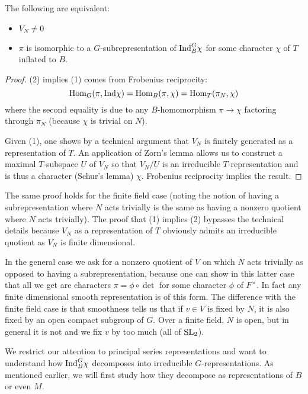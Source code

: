 \begin{prop}
    The following are equivalent:
    \begin{itemize}
        \item $V_N \neq 0$
        \item $\pi$ is isomorphic to a $G$-subrepresentation of $\mathrm{Ind}_B^G \chi$ for some character $\chi$ of $T$ inflated to $B$.
    \end{itemize}
\end{prop}
\begin{proof}
    (2) implies (1) comes from Frobenius reciprocity:
    $$\mathrm{Hom}_G(\pi,\mathrm{Ind} \chi) = \mathrm{Hom}_B(\pi, \chi) = \mathrm{Hom}_T(\pi_N,\chi)$$ where the second equality is due to any $B$-homomorphism $\pi \to \chi$ factoring through $\pi_N$ (because $\chi$ is trivial on $N$).

    Given (1), one shows by a technical argument that $V_N$ is finitely generated as a representation of $T$. An application of Zorn's lemma allows us to construct a maximal $T$-subspace $U$ of $V_N$ so that $V_N/U$ is an irreducible $T$-representation and is thus a character (Schur's lemma) $\chi$. Frobenius reciprocity implies the result.
\end{proof}
\begin{rem}
    The same proof holds for the finite field case (noting the notion of having a subrepresentation where $N$ acts trivially is the same as having a nonzero quotient where $N$ acts trivially). The proof that (1) implies (2) bypasses the technical details because $V_N$ as a representation of $T$ obviously admits an irreducible quotient as $V_N$ is finite dimensional.
\end{rem}
\begin{rem}
    In the general case we ask for a nonzero quotient of $V$ on which $N$ acts trivially as opposed to having a subrepresentation, because one can show in this latter case that all we get are characters $\pi = \phi \circ \det$ for some character $\phi$ of $F^\times$. In fact any finite dimensional smooth representation is of this form. The difference with the finite field case is that smoothness tells us that if $v\in V$ is fixed by $N$, it is also fixed by an open compact subgroup of $G$. Over a finite field, $N$ is open, but in general it is not and we fix $v$ by too much (all of $\mathrm{SL}_2$).
\end{rem}

We restrict our attention to principal series representations and want to understand how $\mathrm{Ind}_B^G \chi$ decomposes into irreducible $G$-representations. As mentioned earlier, we will first study how they decompose as representations of $B$ or even $M$. 


